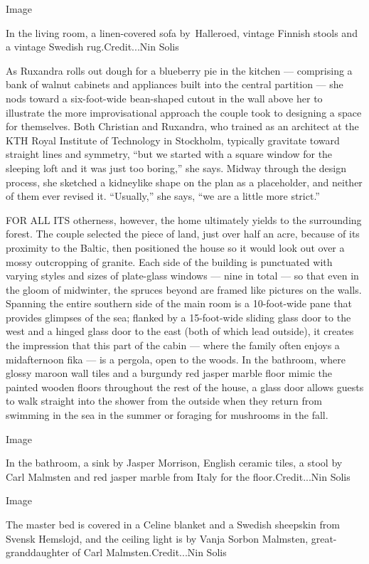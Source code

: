 Image

In the living room, a linen-covered sofa by~Halleroed, vintage Finnish
stools and a vintage Swedish rug.Credit...Nin Solis

As Ruxandra rolls out dough for a blueberry pie in the kitchen ---
comprising a bank of walnut cabinets and appliances built into the
central partition --- she nods toward a six-foot-wide bean-shaped cutout
in the wall above her to illustrate the more improvisational approach
the couple took to designing a space for themselves. Both Christian and
Ruxandra, who trained as an architect at the KTH Royal Institute of
Technology in Stockholm, typically gravitate toward straight lines and
symmetry, ``but we started with a square window for the sleeping loft
and it was just too boring,'' she says. Midway through the design
process, she sketched a kidneylike shape on the plan as a placeholder,
and neither of them ever revised it. ``Usually,'' she says, ``we are a
little more strict.''

FOR ALL ITS otherness, however, the home ultimately yields to the
surrounding forest. The couple selected the piece of land, just over
half an acre, because of its proximity to the Baltic, then positioned
the house so it would look out over a mossy outcropping of granite. Each
side of the building is punctuated with varying styles and sizes of
plate-glass windows --- nine in total --- so that even in the gloom of
midwinter, the spruces beyond are framed like pictures on the walls.
Spanning the entire southern side of the main room is a 10-foot-wide
pane that provides glimpses of the sea; flanked by a 15-foot-wide
sliding glass door to the west and a hinged glass door to the east (both
of which lead outside), it creates the impression that this part of the
cabin --- where the family often enjoys a midafternoon fika --- is a
pergola, open to the woods. In the bathroom, where glossy maroon wall
tiles and a burgundy red jasper marble floor mimic the painted wooden
floors throughout the rest of the house, a glass door allows guests to
walk straight into the shower from the outside when they return from
swimming in the sea in the summer or foraging for mushrooms in the fall.

Image

In the bathroom, a sink by Jasper Morrison, English ceramic tiles, a
stool by Carl Malmsten and red jasper marble from Italy for the
floor.Credit...Nin Solis

Image

The master bed is covered in a Celine blanket and a Swedish sheepskin
from Svensk Hemslojd, and the ceiling light is by Vanja Sorbon Malmsten,
great-granddaughter of Carl Malmsten.Credit...Nin Solis

